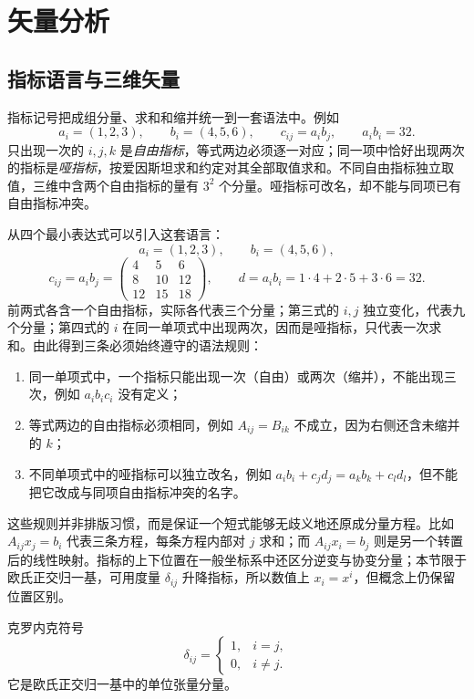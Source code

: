 
\section{矢量分析}

\subsection{指标语言与三维矢量}

指标记号把成组分量、求和和缩并统一到一套语法中。例如
\[
 a_i=(1,2,3),\qquad b_i=(4,5,6),\qquad
 c_{ij}=a_ib_j,\qquad a_ib_i=32.
\]
只出现一次的 $i,j,k$ 是\emph{自由指标}，等式两边必须逐一对应；同一项中恰好出现两次的指标是\emph{哑指标}，按爱因斯坦求和约定对其全部取值求和。不同自由指标独立取值，三维中含两个自由指标的量有 $3^2$ 个分量。哑指标可改名，却不能与同项已有自由指标冲突。

从四个最小表达式可以引入这套语言：
\[
 a_i=(1,2,3),\qquad b_i=(4,5,6),
\]
\[
 c_{ij}=a_ib_j=
 \begin{pmatrix}4&5&6\\8&10&12\\12&15&18\end{pmatrix},
 \qquad d=a_ib_i=1\cdot4+2\cdot5+3\cdot6=32.
\]
前两式各含一个自由指标，实际各代表三个分量；第三式的 $i,j$ 独立变化，代表九个分量；第四式的 $i$ 在同一单项式中出现两次，因而是哑指标，只代表一次求和。由此得到三条必须始终遵守的语法规则：

\begin{enumerate}
 \item 同一单项式中，一个指标只能出现一次（自由）或两次（缩并），不能出现三次，例如 $a_ib_ic_i$ 没有定义；
 \item 等式两边的自由指标必须相同，例如 $A_{ij}=B_{ik}$ 不成立，因为右侧还含未缩并的 $k$；
 \item 不同单项式中的哑指标可以独立改名，例如
 $a_ib_i+c_jd_j=a_kb_k+c_ld_l$，但不能把它改成与同项自由指标冲突的名字。
\end{enumerate}

这些规则并非排版习惯，而是保证一个短式能够无歧义地还原成分量方程。比如
$A_{ij}x_j=b_i$ 代表三条方程，每条方程内部对 $j$ 求和；而
$A_{ij}x_i=b_j$ 则是另一个转置后的线性映射。指标的上下位置在一般坐标系中还区分逆变与协变分量；本节限于欧氏正交归一基，可用度量 $\delta_{ij}$ 升降指标，所以数值上 $x_i=x^i$，但概念上仍保留位置区别。

\begin{advdefinition}{克罗内克符号}\label{advA3:def:kronecker}
\[
 \delta_{ij}=\begin{cases}1,&i=j,\\0,&i\ne j.
 \end{cases}
\]
它是欧氏正交归一基中的单位张量分量。
\end{advdefinition}


